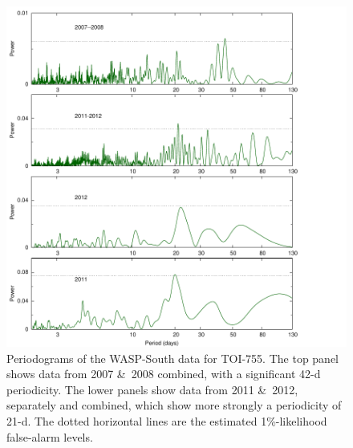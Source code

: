 \documentclass[fleqn,usenatbib]{mnras}
\begin{document}
\begin{figure}
\centering
\includegraphics[width=\columnwidth, trim={0 0.8cm 1.8cm 0.1cm}]{toi755_wasp}
  \caption{Periodograms of the WASP-South data for TOI-755. The top panel shows data from 2007 \&\ 2008 combined, with a significant 42-d periodicity. The lower panels show data from 2011 \&\ 2012, separately and combined, which show more strongly a periodicity of 21-d. The dotted horizontal lines are the estimated 1\%-likelihood false-alarm levels.}
\label{fig:wasp}
\end{figure}
\end{document}
